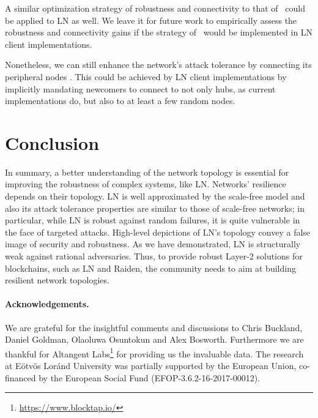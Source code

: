 \documentclass[runningheads]{llncs}
\begin{document}
A similar optimization strategy of robustness and connectivity to that of~\cite{shargel2003optimization} could be applied to LN as well. We leave it for future work to empirically assess the robustness and connectivity gains if the strategy of~\cite{shargel2003optimization} would be implemented in LN client implementations. 

Nonetheless, we can still enhance the network's attack tolerance by connecting its peripheral nodes \cite{barabasi2016network}. This could be achieved by LN client implementations by implicitly mandating newcomers to connect to not only hubs, as current implementations do, but also to at least a few random nodes.

\section{Conclusion}
In summary, a better understanding of the network topology is essential
for improving the robustness of complex systems, like LN. Networks' resilience depends on their topology. LN is well approximated by the scale-free model and also its attack tolerance properties are similar to those of scale-free networks; in particular, while LN is robust against random failures, it is quite vulnerable in the face of targeted attacks. 
High-level depictions of LN's topology convey a false image of security and robustness. As we have demonstrated, LN is structurally weak against rational adversaries. Thus, to provide robust Layer-2 solutions for blockchains, such as LN and Raiden, the community needs to aim at building resilient network topologies.
\paragraph{\textbf{Acknowledgements.}}
We are grateful for the insightful comments and discussions to Chris Buckland, Daniel Goldman, Olaoluwa Osuntokun and Alex Bosworth. Furthermore we are thankful for Altangent Labs\footnote{\url{https://www.blocktap.io/}} for providing us the invaluable data.  The research at Eötvös Loránd University was partially supported by the European Union, co-financed by the European Social Fund (EFOP-3.6.2-16-2017-00012).
%
%
%
\newpage


\end{document}
